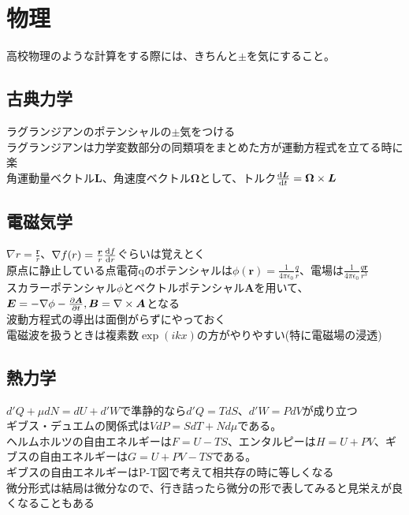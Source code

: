 \documentclass{ltjsarticle}
\begin{document}
  \section{物理}
  高校物理のような計算をする際には、きちんと$\pm$を気にすること。\\
  \subsection{古典力学}
  ラグランジアンのポテンシャルの$\pm$気をつける\\
  ラグランジアンは力学変数部分の同類項をまとめた方が運動方程式を立てる時に楽\\
  角運動量ベクトル$\bm{L}$、角速度ベクトル$\bm{\Omega}$として、トルク$\dv{\bm{L}}{t}=\bm{\Omega}\times\bm{L}$

  \subsection{電磁気学}
  $\nabla r=\frac{\bm{r}}{r}$、$\nabla f(r)=\frac{\bm{r}}{r}\dv{f}{r}$ぐらいは覚えとく\\
  原点に静止している点電荷qのポテンシャルは$\phi(\bm{r})=\frac{1}{4\pi\epsilon_0}\frac{q}{r}$、電場は$\frac{1}{4\pi\epsilon_0}\frac{q\bm{r}}{r^3}$\\
  スカラーポテンシャル$\phi$とベクトルポテンシャル$\bm{A}$を用いて、$\bm{E}=-\nabla\phi-\pdv{\bm{A}}{t},\bm{B}=\nabla\times \bm{A}$となる\\
  波動方程式の導出は面倒がらずにやっておく\\
  電磁波を扱うときは複素数$\exp(ikx)$の方がやりやすい(特に電磁場の浸透)\\
  \subsection{熱力学}
  $d'Q+\mu dN=dU+d'W$で準静的なら$d'Q=TdS$、$d'W=PdV$が成り立つ\\
  ギブス・デュエムの関係式は$VdP=SdT+Nd\mu$である。\\
  ヘルムホルツの自由エネルギーは$F=U-TS$、エンタルピーは$H=U+PV$、ギブスの自由エネルギーは$G=U+PV-TS$である。\\
  ギブスの自由エネルギーはP-T図で考えて相共存の時に等しくなる\\
  微分形式は結局は微分なので、行き詰ったら微分の形で表してみると見栄えが良くなることもある\\
\end{document}
